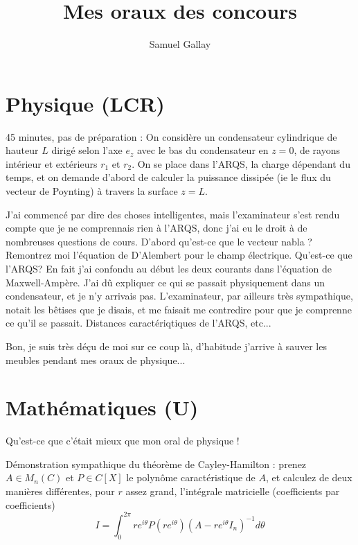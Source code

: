 \documentclass[french,a4paper, 12pt]{article}
\title{\textbf{Mes oraux des concours}}
\author{Samuel Gallay}
\begin{document}
\maketitle

\section*{}

\section*{Physique (LCR)}

45 minutes, pas de préparation : On considère un condensateur cylindrique de hauteur $L$ dirigé selon l'axe $e_z$ avec le bas du condensateur en $z = 0$, de rayons intérieur et extérieurs $r_1$ et $r_2$. On se place dans l'ARQS, la charge dépendant du temps, et on demande d'abord de calculer la puissance dissipée (ie le flux du vecteur de Poynting) à travers la surface $z = L$.

J'ai commencé par dire des choses intelligentes, mais l'examinateur s'est rendu compte que je ne comprennais rien à l'ARQS, donc j'ai eu le droit à de nombreuses questions de cours. D'abord qu'est-ce que le vecteur nabla ? Remontrez moi l'équation de D'Alembert pour le champ électrique. Qu'est-ce que l'ARQS? En fait j'ai confondu au début  les deux courants dans l'équation de Maxwell-Ampère. J'ai dû expliquer ce qui se passait physiquement dans un condensateur, et je n'y arrivais pas. L'examinateur, par ailleurs très sympathique, notait les bêtises que je disais, et me faisait me contredire pour que je comprenne ce qu'il se passait. Distances caractériqtiques de l'ARQS, etc...

Bon, je suis très déçu de moi sur ce coup là, d'habitude j'arrive à sauver les meubles pendant mes oraux de physique...

\section*{Mathématiques (U)}
Qu'est-ce que c'était mieux que mon oral de physique !

Démonstration sympathique du théorème de Cayley-Hamilton : prenez $A \in M_n(C)$ et $P\in C[X]$ le polynôme caractéristique de $A$, et calculez de deux manières différentes, pour $r$ assez grand, l'intégrale matricielle (coefficients par coefficients) $$I = \int_0^{2\pi} r e^{i\theta}P(re^{i\theta})(A-re^{i\theta}I_n)^{-1}d\theta$$ 
\end{document}
